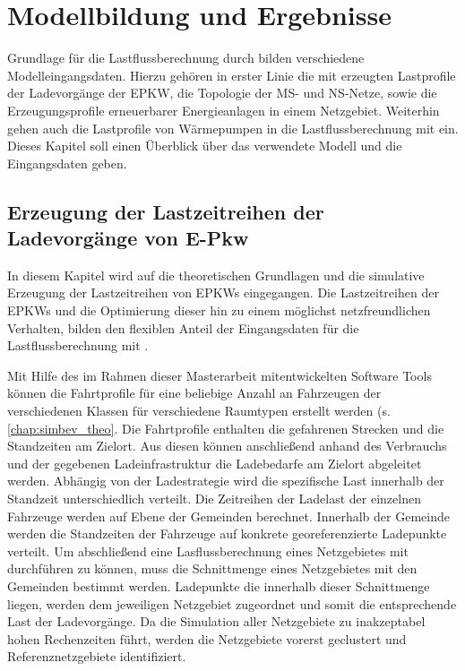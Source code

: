 
\section{Modellbildung und Ergebnisse}

Grundlage für die Lastflussberechnung durch \edisgo bilden verschiedene Modelleingangsdaten.
Hierzu gehören in erster Linie die mit \simbev erzeugten Lastprofile der Ladevorgänge der \gls{EPKW}, die Topologie der \gls{MS}- und \gls{NS}-Netze, sowie die Erzeugungsprofile erneuerbarer Energieanlagen in einem Netzgebiet.
Weiterhin gehen auch die Lastprofile von Wärmepumpen in die Lastflussberechnung mit ein.
Dieses Kapitel soll einen Überblick über das verwendete Modell und die Eingangsdaten geben.\medskip


\subsection{Erzeugung der Lastzeitreihen der Ladevorgänge von E-Pkw}

In diesem Kapitel wird auf die theoretischen Grundlagen und die simulative Erzeugung der Lastzeitreihen von \glspl{EPKW} eingegangen.
Die Lastzeitreihen der \glspl{EPKW} und die Optimierung dieser hin zu einem möglichst netzfreundlichen Verhalten, bilden den flexiblen Anteil der Eingangsdaten für die Lastflussberechnung mit \edisgo.\medskip

Mit Hilfe des im Rahmen dieser Masterarbeit mitentwickelten Software Tools \simbev können die Fahrtprofile für eine beliebige Anzahl an Fahrzeugen der verschiedenen Klassen für verschiedene Raumtypen erstellt werden (s. \autoref{chap:simbev_theo}.
Die Fahrtprofile enthalten die gefahrenen Strecken und die Standzeiten am Zielort.
Aus diesen können anschließend anhand des Verbrauchs und der gegebenen Ladeinfrastruktur die Ladebedarfe am Zielort abgeleitet werden.
Abhängig von der Ladestrategie wird die spezifische Last innerhalb der Standzeit unterschiedlich verteilt.
Die Zeitreihen der Ladelast der einzelnen Fahrzeuge werden auf Ebene der Gemeinden berechnet.
Innerhalb der Gemeinde werden die Standzeiten der Fahrzeuge auf konkrete georeferenzierte Ladepunkte verteilt.
Um abschließend eine Lasflussberechnung eines Netzgebietes mit \edisgo durchführen zu können, muss die Schnittmenge eines \dingo Netzgebietes mit den Gemeinden bestimmt werden.
Ladepunkte die innerhalb dieser Schnittmenge liegen, werden dem jeweiligen Netzgebiet zugeordnet und somit die entsprechende Last der Ladevorgänge.
Da die Simulation aller Netzgebiete zu inakzeptabel hohen Rechenzeiten führt, werden die \dingo Netzgebiete vorerst geclustert und Referenznetzgebiete identifiziert.



